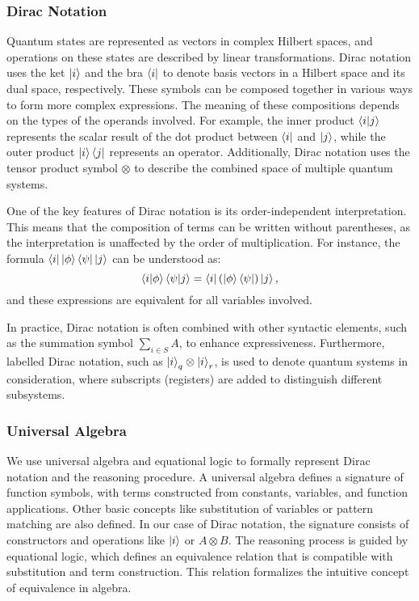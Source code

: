 \subsubsection{Dirac Notation}

Quantum states are represented as vectors in complex Hilbert spaces, and operations on these states are described by linear transformations. Dirac notation uses the ket \( \ket{i} \) and the bra \( \bra{i} \) to denote basis vectors in a Hilbert space and its dual space, respectively. These symbols can be composed together in various ways to form more complex expressions. The meaning of these compositions depends on the types of the operands involved.
For example, the inner product \( \braket{i|j} \) represents the scalar result of the dot product between \( \bra{i} \) and \( \ket{j} \), while the outer product \( \ket{i}\bra{j} \) represents an operator. Additionally, Dirac notation uses the tensor product symbol \( \otimes \) to describe the combined space of multiple quantum systems.

One of the key features of Dirac notation is its order-independent interpretation. This means that the composition of terms can be written without parentheses, as the interpretation is unaffected by the order of multiplication. For instance, the formula \( \bra{i}\ket{\phi}\bra{\psi}\ket{j} \) can be understood as:
\[
    \braket{i|\phi}\braket{\psi|j} = \bra{i} (\ket{\phi}\bra{\psi}) \ket{j},
\]
and these expressions are equivalent for all variables involved.

In practice, Dirac notation is often combined with other syntactic elements, such as the summation symbol \( \sum_{i \in S} A \), to enhance expressiveness. Furthermore, labelled Dirac notation, such as \( \ket{i}_q \otimes \ket{i}_r \), is used to denote quantum systems in consideration, where subscripts (registers) are added to distinguish different subsystems.

\subsubsection{Universal Algebra}
We use universal algebra and equational logic to formally represent Dirac notation and the reasoning procedure. A universal algebra defines a signature of function symbols, with terms constructed from constants, variables, and function applications. 
Other basic concepts like substitution of variables or pattern matching are also defined.
In our case of Dirac notation, the signature consists of constructors and operations like $\ket{i}$ or $A \otimes B$.
The reasoning process is guided by equational logic, which defines an equivalence relation that is compatible with substitution and term construction. This relation formalizes the intuitive concept of equivalence in algebra.

